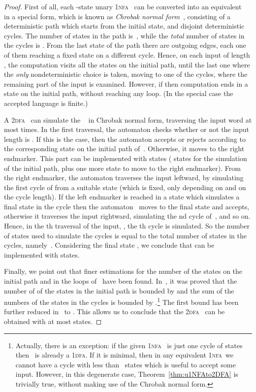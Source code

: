 \documentclass[11pt]{article}
\newcommand*{\tw}{\textsc{2}}
\newcommand*{\twdfa}{\tw\textsc{dfa}}
\newcommand*{\ow}{\textsc{1}}
\newcommand*{\owdfa}{\ow\textsc{dfa}}
\newcommand*{\ownfa}{\ow\textsc{nfa}}
\begin{document}
{\begin{proof}
	First of all, each -state unary \ownfa~ can be converted into an equivalent
	~ in a special form, which is known as \emph{Chrobak normal form}~\cite[Lemma~4.3]{Chrobak1986}, 
	consisting of a deterministic path which starts from the initial state,
	and  disjoint deterministic cycles. The number of states in the path is~,
	while the \emph{total} number of states in the cycles is .
	From the last state of the path there are  outgoing edges, each one of them reaching
	a fixed state on a different cycle. Hence, on each input of length , the computation visits
	all the states on the initial path, until the last one where the \emph{only} nondeterministic
	choice is taken, moving to one of the cycles, where the remaining part of the input
	is examined. However, if  then computation ends in a state on the initial path, without reaching
	any loop. (In the special case  the accepted language is finite.)
	
	A \twdfa~ can simulate the ~ in Chrobak normal form, traversing the input
	word at most  times. In the first traversal, the automaton checks whether or not the input
	length is . If this is the case, then the automaton accepts or rejects according to the
	corresponding state on the initial path of~. Otherwise, it moves to the right endmarker.
	This part can be implemented with  states ( states for the simulation of the initial path,
	plus one more state to move to the right endmarker).
	From the right endmarker, the automaton traverses the input leftward, by simulating the first
	cycle of  from a suitable state (which is fixed, only depending on  and on the cycle length).
	If the left endmarker is reached in a state which simulates a final state in the cycle then the
	automaton~ moves to the final state  and accepts, otherwise it
	traverses the input  rightward, simulating the nd cycle of~, and so on.
	Hence, in the th traversal of the input, , the th cycle is simulated.
	So the number of states used to simulate the cycles is equal to the total number of
	states in the cycles, namely~.
	Considering the final state , we conclude that  can be implemented with  states.
	
	Finally, we point out that finer estimations for the number of the states on the initial path and in the
	loops of~ have been found. In~\cite{Geffert2007}, it was proved that the number of  of the states
	in the initial path is bounded by  and the sum  of the numbers of the states in the cycles 
	is bounded by .\footnote{Actually, there is an exception: if the given \ownfa~ is just one cycle of  states then~ is
	already a \owdfa. If it is minimal, then in any equivalent \ownfa\ we cannot have a cycle with less than~ states
	which is useful to accept some input.
	However, in this degenerate case, Theorem~\ref{thm:u1NFAto2DFA} is trivially true, without making use of the Chrobak
	normal form.}
	The first bound has been further reduced in~\cite{Gawrychowski2011}
	to . This allows us to conclude that the \twdfa~ can be obtained
	with at most  states.
\end{proof}

}
\end{document}
